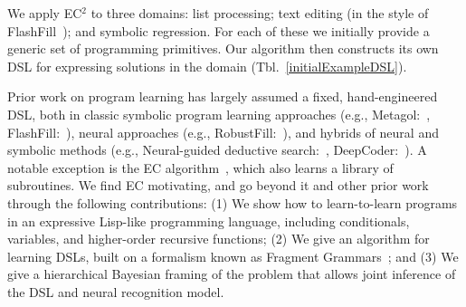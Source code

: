 \documentclass{article}
\newcommand{\system}{\textsc{EC$^2$} }
\begin{document}
We apply \system to three domains:
list processing; text editing (in the style of FlashFill~\cite{gulwani2011automating}); and symbolic regression.
 For each of these we initially provide a generic
 set of programming primitives.
Our algorithm then constructs
its own DSL for expressing solutions in the domain (Tbl.~\ref{initialExampleDSL}).


Prior work on program learning has largely assumed a fixed, hand-engineered DSL,
both in classic symbolic program learning approaches (e.g., Metagol:~\cite{muggleton2015meta},
FlashFill:~\cite{gulwani2011automating}),
neural approaches  (e.g., RobustFill:~\cite{devlin2017robustfill}), and hybrids of neural and
symbolic methods (e.g., Neural-guided deductive search:~\cite{ngds}, DeepCoder:~\cite{balog2016deepcoder}).
A notable exception is the EC algorithm~\cite{Dechter:2013:BLV:2540128.2540316},
which also learns a library of subroutines.
We find EC motivating, and go beyond it and other prior work through the following contributions: %
(1) We show how to learn-to-learn programs in an expressive Lisp-like programming language, including conditionals, variables, and higher-order recursive functions;
(2) We give an algorithm for learning DSLs,
built on a formalism known as Fragment Grammars~\cite{tim};
and (3) We give a hierarchical Bayesian framing of
the problem that
allows joint inference of the DSL and neural recognition model.



 


\end{document}
